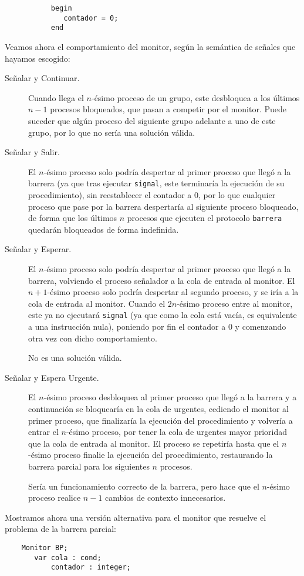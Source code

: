 \begin{ejemplo}
\begin{verbatim}
           begin
              contador = 0;
           end
    \end{verbatim}
Veamos ahora el comportamiento del monitor, según la semántica de señales que hayamos escogido:
\begin{description}
    \item [Señalar y Continuar.] Cuando llega el $n$-ésimo proceso de un grupo, este desbloquea a los últimos $n-1$ procesos bloqueados, que pasan a competir por el monitor. Puede suceder que algún proceso del siguiente grupo adelante a uno de este grupo, por lo que no sería una solución válida.
    \item [Señalar y Salir.] El $n$-ésimo proceso solo podría despertar al primer proceso que llegó a la barrera (ya que tras ejecutar \verb|signal|, este terminaría la ejecución de su procedimiento), sin reestablecer el contador a 0, por lo que cualquier proceso que pase por la barrera despertaría al siguiente proceso bloqueado, de forma que los últimos $n$ procesos que ejecuten el protocolo \verb|barrera| quedarán bloqueados de forma indefinida.
    \item [Señalar y Esperar.] El $n$-ésimo proceso solo podría despertar al primer proceso que llegó a la barrera, volviendo el proceso señalador a la cola de entrada al monitor. El $n+1$-ésimo proceso solo podría despertar al segundo proceso, y se iría a la cola de entrada al monitor. Cuando el $2n$-ésimo proceso entre al monitor, este ya no ejecutará \verb|signal| (ya que como la cola está vacía, es equivalente a una instrucción nula), poniendo por fin el contador a 0 y comenzando otra vez con dicho comportamiento.

        No es una solución válida.
    \item [Señalar y Espera Urgente.] El $n$-ésimo proceso desbloquea al primer proceso que llegó a la barrera y a continuación se bloquearía en la cola de urgentes, cediendo el monitor al primer proceso, que finalizaría la ejecución del procedimiento y volvería a entrar el $n$-ésimo proceso, por tener la cola de urgentes mayor prioridad que la cola de entrada al monitor. El proceso se repetiría hasta que el $n$-ésimo proceso finalie la ejecución del procedimiento, restaurando la barrera parcial para los siguientes $n$ procesos.

        Sería un funcionamiento correcto de la barrera, pero hace que el $n$-ésimo proceso realice $n-1$ cambios de contexto innecesarios.
\end{description}
Mostramos ahora una versión alternativa para el monitor que resuelve el problema de la barrera parcial:
\begin{verbatim}
    Monitor BP;
       var cola : cond;
           contador : integer;


\end{verbatim}
\end{ejemplo}
